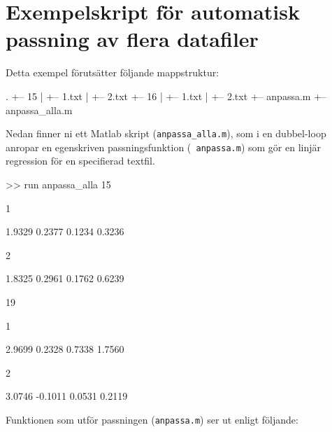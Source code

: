 \section{Exempelskript för automatisk passning av flera datafiler}
\label{sec:matlab-loop-read-fit}
Detta exempel förutsätter följande mappstruktur:

\begin{terminaloutput}
.
+-- 15
|   +-- 1.txt
|   +-- 2.txt
+-- 16
|   +-- 1.txt
|   +-- 2.txt
+-- anpassa.m
+-- anpassa_alla.m
\end{terminaloutput}

Nedan finner ni ett Matlab skript ({\tt anpassa\_alla.m}), som
i en dubbel-loop anropar en egenskriven passningsfunktion ({\tt
  anpassa.m}) som gör en linjär regression för en specifierad textfil. 


\begin{terminaloutput}
>> run anpassa_alla
    15

     1

    1.9329    0.2377    0.1234    0.3236

     2

    1.8325    0.2961    0.1762    0.6239

    19

     1

    2.9699    0.2328    0.7338    1.7560

     2

    3.0746   -0.1011    0.0531    0.2119
\end{terminaloutput}

Funktionen som utför passningen ({\tt anpassa.m}) ser ut enligt följande:


